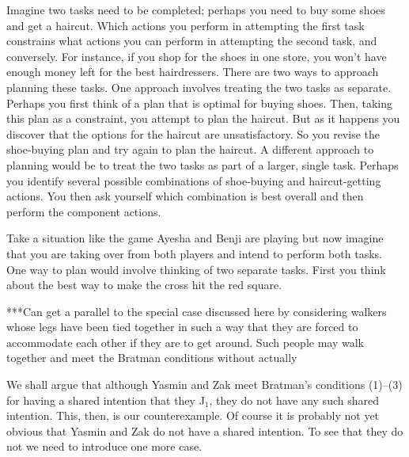 \documentclass[12pt,\papersize]{extarticle}
\begin{document}
Imagine two tasks need to be completed; perhaps you need to buy some shoes and get a haircut. 
Which actions you perform in attempting the first task constrains what actions you can perform in attempting the second task, and conversely.
For instance, if you shop for the shoes in one store, you won't have enough money left for the best hairdressers.
There are two ways to approach planning these tasks.
One approach involves treating the two tasks as separate.
Perhaps you first think of a plan that is optimal for buying shoes.
Then, taking this plan as a constraint, you attempt to plan the haircut.
But as it happens you discover that the options for the haircut are unsatisfactory.
So you revise the shoe-buying plan and try again to plan the haircut.
A different approach to planning would be to treat the two tasks as part of a larger, single task.
Perhaps you identify several possible combinations of shoe-buying and haircut-getting actions.
You then ask yourself which combination is best overall and then perform the component actions.




Take a situation like the game Ayesha and Benji are playing but now imagine that you are taking over from both players and intend to perform both tasks. 
One way to plan would involve thinking of two separate tasks.
First you think about the best way to make the cross hit the red square.



%


 

***Can get a parallel to the special case discussed here by considering walkers whose legs have been tied together in such a way that they are forced to accommodate each other if they are to get around.  Such people may walk together and meet the Bratman conditions without actually 




We shall argue that although Yasmin and Zak meet Bratman's conditions (1)--(3) for having a shared intention that they J$_1$, they do not have any such shared intention.
This, then, is our counterexample.
Of course it is probably not yet obvious that Yasmin and Zak do not have a shared intention.
To see that they do not we need to introduce one more case.
\end{document}
